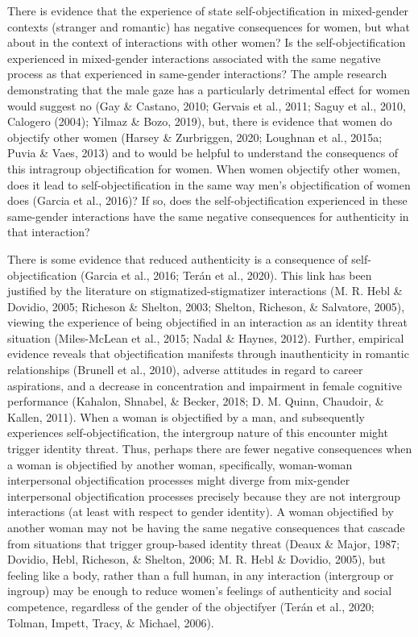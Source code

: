 \documentclass[man]{apa6}
\begin{document}
There is evidence that the experience of state self-objectification in
mixed-gender contexts (stranger and romantic) has negative consequences
for women, but what about in the context of interactions with other
women? Is the self-objectification experienced in mixed-gender
interactions associated with the same negative process as that
experienced in same-gender interactions? The ample research
demonstrating that the male gaze has a particularly detrimental effect
for women would suggest no (Gay \& Castano, 2010; Gervais et al., 2011;
Saguy et al., 2010, Calogero (2004); Yilmaz \& Bozo, 2019), but, there
is evidence that women do objectify other women (Harsey \& Zurbriggen,
2020; Loughnan et al., 2015a; Puvia \& Vaes, 2013) and to would be
helpful to understand the consequencs of this intragroup objectification
for women. When women objectify other women, does it lead to
self-objectification in the same way men's objectification of women does
(Garcia et al., 2016)? If so, does the self-objectification experienced
in these same-gender interactions have the same negative consequences
for authenticity in that interaction?

There is some evidence that reduced authenticity is a consequence of
self-objectification (Garcia et al., 2016; Terán et al., 2020). This
link has been justified by the literature on stigmatized-stigmatizer
interactions (M. R. Hebl \& Dovidio, 2005; Richeson \& Shelton, 2003;
Shelton, Richeson, \& Salvatore, 2005), viewing the experience of being
objectified in an interaction as an identity threat situation
(Miles-McLean et al., 2015; Nadal \& Haynes, 2012). Further, empirical
evidence reveals that objectification manifests through inauthenticity
in romantic relationships (Brunell et al., 2010), adverse attitudes in
regard to career aspirations, and a decrease in concentration and
impairment in female cognitive performance (Kahalon, Shnabel, \& Becker,
2018; D. M. Quinn, Chaudoir, \& Kallen, 2011). When a woman is
objectified by a man, and subsequently experiences self-objectification,
the intergroup nature of this encounter might trigger identity threat.
Thus, perhaps there are fewer negative consequences when a woman is
objectified by another woman, specifically, woman-woman interpersonal
objectification processes might diverge from mix-gender interpersonal
objectification processes precisely because they are not intergroup
interactions (at least with respect to gender identity). A woman
objectified by another woman may not be having the same negative
consequences that cascade from situations that trigger group-based
identity threat (Deaux \& Major, 1987; Dovidio, Hebl, Richeson, \&
Shelton, 2006; M. R. Hebl \& Dovidio, 2005), but feeling like a body,
rather than a full human, in any interaction (intergroup or ingroup) may
be enough to reduce women's feelings of authenticity and social
competence, regardless of the gender of the objectifyer (Terán et al.,
2020; Tolman, Impett, Tracy, \& Michael, 2006).
\end{document}
